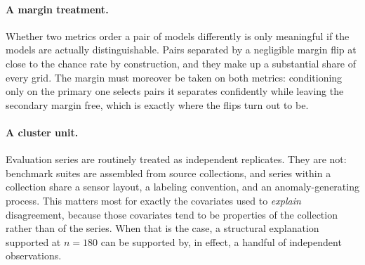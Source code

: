 \documentclass[twoside,11pt]{article}
\begin{document}
\paragraph{A margin treatment.} Whether two metrics order a pair of models
differently is only meaningful if the models are actually distinguishable. Pairs
separated by a negligible margin flip at close to the chance rate by
construction, and they make up a substantial share of every grid. The margin
must moreover be taken on both metrics: conditioning only on the primary one
selects pairs it separates confidently while leaving the secondary margin free,
which is exactly where the flips turn out to be.

\paragraph{A cluster unit.} Evaluation series are routinely treated as
independent replicates. They are not: benchmark suites are assembled from source
collections, and series within a collection share a sensor layout, a labeling
convention, and an anomaly-generating process. This matters most for exactly the
covariates used to \emph{explain} disagreement, because those covariates tend to
be properties of the collection rather than of the series. When that is the case,
a structural explanation supported at $n = 180$ can be supported by, in effect, a
handful of independent observations.
\end{document}
